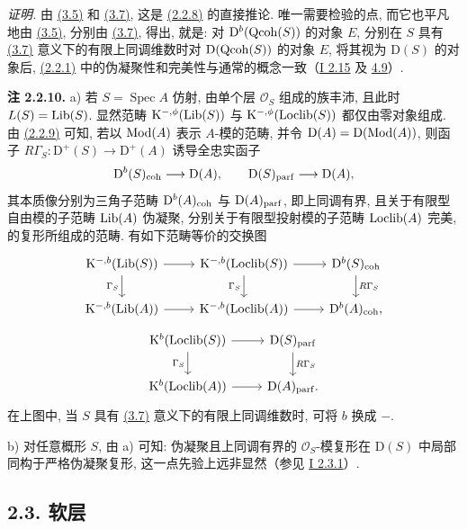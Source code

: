 \emph{证明.} 由 \hyperlink{sga6.e02.prop.3-5}{(3.5)} 和 \hyperlink{sga6.e02.prop.3-7}{(3.7)}, 这是 \hyperlink{sga6.e02.thm.2-2-8}{(2.2.8)} 的直接推论. 唯一需要检验的点, 而它也平凡地由 \hyperlink{sga6.e02.prop.3-5}{(3.5)}, 分别由 \hyperlink{sga6.e02.prop.3-7}{(3.7)}, 得出, 就是: 对 $\mathrm D^{b}(\operatorname{Qcoh}(S))$ 的对象 $E$, 分别在 $S$ 具有 \hyperlink{sga6.e02.prop.3-7}{(3.7)} 意义下的有限上同调维数时对 $\mathrm D(\operatorname{Qcoh}(S))$ 的对象 $E$, 将其视为 $\mathrm D(S)$ 的对象后, \hyperlink{sga6.e02.notation.2-2-1}{(2.2.1)} 中的伪凝聚性和完美性与通常的概念一致（\hyperlink{sga6.e01.ex.2-15}{I 2.15} 及 \hyperlink{sga6.e01.notation.4-9}{4.9}）.

\textbf{注 2.2.10.} a) 若 $S=\operatorname{Spec}A$ 仿射, 由单个层 $\mathcal O_S$ 组成的族丰沛, 且此时 $L(S)=\operatorname{Lib}(S)$. 显然范畴 $\mathrm K^{-,\phi}(\operatorname{Lib}(S))$ 与 $\mathrm K^{-,\phi}(\operatorname{Loclib}(S))$ 都仅由零对象组成. 由 \hyperlink{sga6.e02.prop.2-2-9}{(2.2.9)} 可知, 若以 $\operatorname{Mod}(A)$ 表示 $A$-模的范畴, 并令 $\mathrm D(A)=\mathrm D(\operatorname{Mod}(A))$, 则函子 $R\Gamma_S:\mathrm D^{+}(S)\to\mathrm D^{+}(A)$ 诱导全忠实函子
\[
\mathrm D^{b}(S)_{\mathrm{coh}}\longrightarrow \mathrm D(A),
\qquad
\mathrm D(S)_{\mathrm{parf}}\longrightarrow \mathrm D(A),
\]
其本质像分别为三角子范畴 $\mathrm D^{b}(A)_{\mathrm{coh}}$ 与 $\mathrm D(A)_{\mathrm{parf}}$, 即上同调有界, 且关于有限型自由模的子范畴 $\operatorname{Lib}(A)$ 伪凝聚, 分别关于有限型投射模的子范畴 $\operatorname{Loclib}(A)$ 完美, 的复形所组成的范畴. 有如下范畴等价的交换图
\[
\begin{tikzcd}
\mathrm K^{-,b}(\Lib(S)) \arrow[r] \arrow[d,"\Gamma_S"'] &
\mathrm K^{-,b}(\Loclib(S)) \arrow[r] \arrow[d,"\Gamma_S"'] &
\mathrm D^b(S)_{\coh} \arrow[d,"R\Gamma_S"] \\
\mathrm K^{-,b}(\Lib(A)) \arrow[r] &
\mathrm K^{-,b}(\Loclib(A)) \arrow[r] &
\mathrm D^b(A)_{\coh},
\end{tikzcd}
\]
\[
\begin{tikzcd}
\mathrm K^b(\Loclib(S)) \arrow[r] \arrow[d,"\Gamma_S"'] &
\mathrm D(S)_{\parf} \arrow[d,"R\Gamma_S"] \\
\mathrm K^b(\Loclib(A)) \arrow[r] &
\mathrm D(A)_{\parf}.
\end{tikzcd}
\]
在上图中, 当 $S$ 具有 \hyperlink{sga6.e02.prop.3-7}{(3.7)} 意义下的有限上同调维数时, 可将 $b$ 换成 $-$.

b) 对任意概形 $S$, 由 a) 可知: 伪凝聚且上同调有界的 $\mathcal O_S$-模复形在 $\mathrm D(S)$ 中局部同构于严格伪凝聚复形, 这一点先验上远非显然（参见 \hyperlink{sga6.e01.rem.2-3-1}{I 2.3.1}）.

\subsection*{2.3. 软层}

